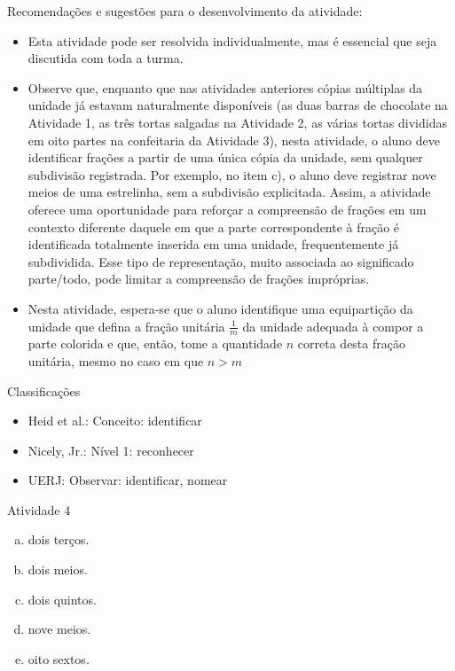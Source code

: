 \documentclass[oneside]{book}
\begin{document}
\begin{multicols}{2}
  Recomendações e sugestões para o desenvolvimento da atividade:
\begin{itemize} %
    \item       Esta atividade pode ser resolvida individualmente, mas é essencial que seja discutida com toda a turma.
    \item       Observe que, enquanto que nas atividades anteriores cópias múltiplas da unidade já estavam naturalmente disponíveis (as duas barras de chocolate na Atividade 1, as três tortas salgadas na Atividade 2, as várias tortas divididas em oito partes na confeitaria da Atividade 3), nesta atividade, o aluno deve identificar frações a partir de uma única cópia da unidade, sem qualquer subdivisão registrada. Por exemplo, no item c), o aluno deve registrar nove meios de uma estrelinha, sem a subdivisão explicitada. Assim, a atividade oferece uma oportunidade para reforçar a compreensão de frações em um contexto diferente daquele em que a parte correspondente à fração é identificada totalmente inserida em uma unidade, frequentemente já subdividida. Esse tipo de representação, muito associada ao significado parte/todo, pode limitar a compreensão de frações impróprias.
    \item       Nesta atividade, espera-se que o aluno identifique uma equipartição da unidade que defina a fração unitária       $\frac{1}{m}$       da unidade adequada à compor a parte colorida e que, então, tome a quantidade       $n$       correta desta fração unitária, mesmo no caso em que       $n > m$
\end{itemize} %


  Classificações
\begin{itemize} %
    \item       Heid et al.: Conceito: identificar
    \item       Nicely, Jr.: Nível 1: reconhecer
    \item       UERJ: Observar: identificar, nomear
\end{itemize} %

\begin{resposta*}{Atividade 4}
  \begin{enumerate}[a)]
   \item dois terços.
   \item dois meios.
   \item dois quintos.
   \item nove meios.
   \item oito sextos.
\end{enumerate}
  \end{resposta*}




\end{multicols}
\end{document}
